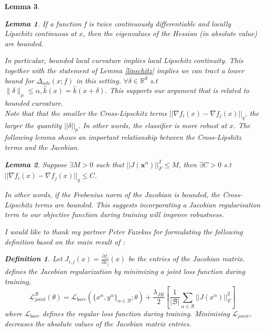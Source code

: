 \documentclass[a4paper,singlecolumn,12pt]{article}
\newtheorem{lemma}{Lemma}[subsection]
\newtheorem{definition}{Definition}[subsection]
\begin{document}
\begin{lemma}
\begin{lemma}
If a function f is twice continuously differentiable and locally Lipschitz continuous at $x$, then the eigenvalues of the Hessian (in absolute value) are bounded.
\end{lemma}

In particular, bounded local curvature implies local Lipschitz continuity. This together with the statement of Lemma \ref{lipschitz} implies we can tract a lower bound for $\Delta_{adv}(x;f)$ in this setting. $\forall \delta \in \mathbb{R}^{d} $ s.t $\|\delta\|_{\mu} \leqslant \alpha, \hat{k}(x)=\hat{k}(x+\delta).$ This supports our argument that is related to bounded curvature.\\

Note that that the smaller the Cross-Lipschitz terms $||\nabla f_i(x)-\nabla f_j(x)||_q$, the larger the quantity $||\delta||_p$. In other words, the classifier is more robust at $x$. The following lemma shows an important relationship between the Cross-Lipshitz terms and the Jacobian. 

\begin{lemma}\label{lemma:jacobi_rob}
Suppose $\exists M>0$ such that $||J(\boldsymbol{x}^\alpha)||^2_F \leq M$, then $\exists C>0$ s.t $||\nabla f_i(x)-\nabla f_j(x)||_q\leq C$.
\end{lemma}

In other words, if the Frobenius norm of the Jacobian is bounded, the Cross-Lipschitz terms are bounded. This suggests incorporating a Jacobian regularisation term to our objective function during training will improve robustness.
\newpage

I would like to thank my partner Peter Fazekas for formulating the following definition based on the
main result of \cite{hoffman2019robust}:
\begin{definition}\label{jac_reg}
Let $J_{i,j}({x})= \frac{\partial f_i}{\partial x_j}({x})$ be the entries of the Jacobian matrix. \cite{hoffman2019robust} defines the Jacobian regularization by minimizing a joint loss function during training,
\begin{equation}
    \mathcal{L}_{joint}^\mathcal{B}({\theta})= \mathcal{L}_{bare}(\{{x}^\alpha,{y}^\alpha\}_{\alpha \in \mathcal{B}};{\theta})+ \frac{\lambda_{JR}}{2} \left[ \frac{1}{|\mathcal{B}|}\underset{\alpha \in \mathcal{B}}{\sum}||J({x}^\alpha)||^2_F \right] \nonumber
\end{equation}
where $\mathcal{L}_{bare}$ defines the regular loss function during training. Minimising $\mathcal{L}_{joint}$, decreases the absolute values of the Jacobian matrix entries. 
\end{definition}


\end{lemma}
\end{document}
